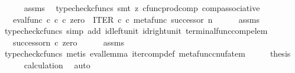 \begin{isabellebody}
\ \ \ \ \isamarkupfalse%
\ assms\ \isamarkupfalse%
\ {\isacharparenleft}{\kern0pt}typecheck{\isacharunderscore}{\kern0pt}cfuncs{\isacharcomma}{\kern0pt}\ smt\ {\isacharparenleft}{\kern0pt}z{}{\isacharparenright}{\kern0pt}\ cfunc{\isacharunderscore}{\kern0pt}prod{\isacharunderscore}{\kern0pt}comp\ comp{\isacharunderscore}{\kern0pt}associative{}{\isacharparenright}{\kern0pt}\isanewline
\ \ \isamarkupfalse%
\ \isamarkupfalse%
\ {\isachardoublequoteopen}{\isachardot}{\kern0pt}{\isachardot}{\kern0pt}{\isachardot}{\kern0pt}\ {\isacharequal}{\kern0pt}\ eval{\isacharunderscore}{\kern0pt}func\ {\isasymnat}\isactrlsub c\ {\isasymnat}\isactrlsub c\ {\isasymcirc}\isactrlsub c\ {\isasymlangle}zero{\isacharcomma}{\kern0pt}\ \ ITER\ {\isasymnat}\isactrlsub c\ {\isasymcirc}\isactrlsub c\ {\isasymlangle}metafunc\ successor{\isacharcomma}{\kern0pt}\ n{\isasymrangle}{\isasymrangle}{\isachardoublequoteclose}\isanewline
\ \ \ \ \isamarkupfalse%
\ assms\ \isamarkupfalse%
\ {\isacharparenleft}{\kern0pt}typecheck{\isacharunderscore}{\kern0pt}cfuncs{\isacharcomma}{\kern0pt}\ simp\ add{\isacharcolon}{\kern0pt}\ id{\isacharunderscore}{\kern0pt}left{\isacharunderscore}{\kern0pt}unit{}\ id{\isacharunderscore}{\kern0pt}right{\isacharunderscore}{\kern0pt}unit{}\ terminal{\isacharunderscore}{\kern0pt}func{\isacharunderscore}{\kern0pt}comp{\isacharunderscore}{\kern0pt}elem{\isacharparenright}{\kern0pt}\isanewline
\ \ \isamarkupfalse%
\ \isamarkupfalse%
\ {\isachardoublequoteopen}{\isachardot}{\kern0pt}{\isachardot}{\kern0pt}{\isachardot}{\kern0pt}\ {\isacharequal}{\kern0pt}\ {\isacharparenleft}{\kern0pt}successor\isactrlbsup {\isasymcirc}n\isactrlesup {\isacharparenright}{\kern0pt}\ {\isasymcirc}\isactrlsub c\ zero{\isachardoublequoteclose}\isanewline
\ \ \ \ \isamarkupfalse%
\ assms\ \isamarkupfalse%
\ {\isacharparenleft}{\kern0pt}typecheck{\isacharunderscore}{\kern0pt}cfuncs{\isacharcomma}{\kern0pt}\ metis\ eval{\isacharunderscore}{\kern0pt}lemma\ iter{\isacharunderscore}{\kern0pt}comp{\isacharunderscore}{\kern0pt}def{}\ metafunc{\isacharunderscore}{\kern0pt}cnufatem{\isacharparenright}{\kern0pt}\isanewline
\ \ \isamarkupfalse%
\ \isamarkupfalse%
\ {\isacharquery}{\kern0pt}thesis\isanewline
\ \ \ \ \isamarkupfalse%
\ calculation\ \isamarkupfalse%
\ auto\isanewline
{}\isamarkupfalse%

\end{isabellebody}
